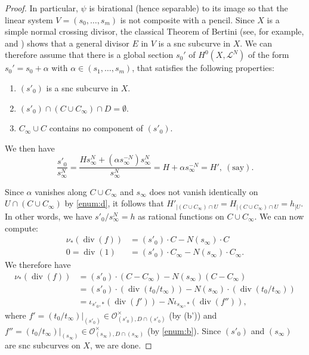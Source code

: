 \documentclass[JEP,XML,SOM,Unicode,published]{cedram}
\let\mathcal\mathscr
\theoremstyle{definition}
\newcommand{\sL}{{\mathcal L}}
\newcommand{\sO}{{\mathcal O}}\let\cO\sO
\DeclareMathOperator{\divf}{div}
\begin{document}
\begin{proof}
In particular, $\psi$ is birational (hence separable) to its image so that the linear
system $V = (s_0, \ldots, s_m)$ is not composite with a pencil.
Since $X$ is a simple normal crossing divisor, the
classical Theorem of Bertini (see, for example, \cite[Th.\,I.6.3]{Zar58}
and \cite[Chap.\,6]{Jou})
shows that a general divisor $E$ in $V$ is a snc subcurve in $X$.
We can therefore assume that there is a global section $s_0'$ of
$H^0(X, \sL^{N})$ of the form $s_0' = s_0 +\alpha$ with
$\alpha \in (s_1,\ldots, s_m)$, that satisfies the following properties:\enlargethispage{.5\baselineskip}%
\begin{enumerate}\renewcommand{\theenumi}{\alph{enumi}$'$}
\item
$(s'_0)$ is a snc subcurve in $X$.
\item
$(s'_0) \cap (C \cup C_{\infty}) \cap D = \emptyset$.
\item
$C_{\infty} \cup C$ contains no component of $(s'_0)$.
\end{enumerate}

We then have\vspace*{-3pt}
\[
\frac{s'_0}{s^N_{\infty}} = \frac{Hs^N_{\infty} + (\alpha s^{-N}_{\infty})
s^N_{\infty}}{s^N_{\infty}} = H + \alpha s^{-N}_{\infty} = H', \ (\mbox{say}).
\]

Since $\alpha$ vanishes along $C \cup C_{\infty}$ and $s_{\infty}$ does not
vanish identically on $U\cap (C\cup C_\infty)$ by \eqref{enum:d}, it follows that
$H'_{|{(C \cup C_{\infty}) \cap U}} =
H_{|{(C \cup C_{\infty}) \cap U}} = h_{|U}$. In other words, we have
${s'_0}/{s^N_{\infty}} = h$ as rational functions on $C \cup C_{\infty}$.
We can now compute:\vspace*{-3pt}
\begin{align*}
\nu_*(\divf(f)) &= (s'_0) \cdot C - N (s_\infty) \cdot C\\
0 = \divf(1) &= (s'_0) \cdot C_{\infty} - N (s_\infty)\cdot C_{\infty}.
\end{align*}
We therefore have\vspace*{-3pt}
\begin{align*}
\nu_*(\divf(f)) & = (s'_0) \cdot (C - C_{\infty}) -
N(s_{\infty})(C - C_{\infty}) \\
& = (s'_0) \cdot (\divf({t_0}/{t_{\infty}})) - N(s_{\infty}) \cdot
(\divf({t_0}/{t_{\infty}})) \\
& = \iota_{{s'_0}, *}(\divf(f')) - N \iota_{{s_{\infty}}, *}(\divf(f'')),
\end{align*}
where $f' = ({t_0}/{t_{\infty}})|_{(s'_0)} \in
\sO^{\times}_{(s'_0), D \cap (s'_0)}$ (by (b')) and
$f'' = (t_0/t_{\infty})|_{(s_\infty)} \in
\sO_{(s_\infty), D\cap (s_\infty) }^{\times}$ (by \eqref{enum:b}).
Since $(s'_0)$ and $(s_\infty)$ are snc subcurves on $X$, we are done.
\end{proof}
\end{document}

